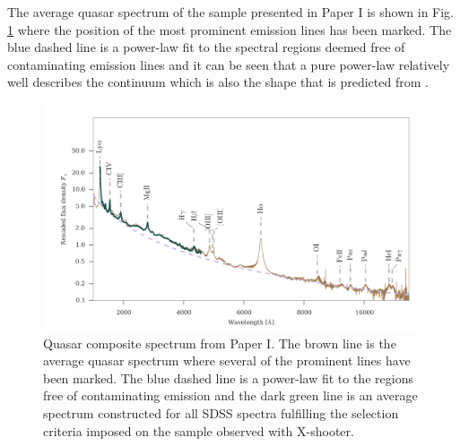 The average quasar spectrum of the sample presented in Paper I is shown in Fig. \ref{fig:intro:qsospec} where the position of the most prominent emission lines has been marked. The blue dashed line is a power-law fit to the spectral regions deemed free of contaminating emission lines and it can be seen that a pure power-law relatively well describes the continuum which is also the shape that is predicted from \citep{Pereyra2006}.

\begin{figure}[htb]
	\includegraphics[width=\textwidth]{gfx/qsospec}
	\caption{Quasar composite spectrum from Paper I. The brown line is the average quasar spectrum where several of the prominent lines have been marked. The blue dashed line is a power-law fit to the regions free of contaminating emission and  the dark green line is an average spectrum constructed for all SDSS spectra fulfilling the selection criteria imposed on the sample observed with X-shooter.}
	\label{fig:intro:qsospec}
\end{figure}


